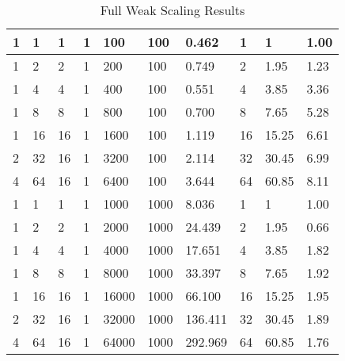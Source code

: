 \begin{appendices}
\begin{table}[H]
\begin{tabular}{|l|l|l|l|l|l|l|l|l|l|}
1 & 1 & 1 & 1 & 100 & 100 & 0.462 & 1 & 1 & 1.00 \\ \hline
1 & 2 & 2 & 1 & 200 & 100 & 0.749 & 2 & 1.95 & 1.23 \\ \hline
1 & 4 & 4 & 1 & 400 & 100 & 0.551 & 4 & 3.85 & 3.36 \\ \hline
1 & 8 & 8 & 1 & 800 & 100 & 0.700 & 8 & 7.65 & 5.28 \\ \hline
1 & 16 & 16 & 1 & 1600 & 100 & 1.119 & 16 & 15.25 & 6.61 \\ \hline
2 & 32 & 16 & 1 & 3200 & 100 & 2.114 & 32 & 30.45 & 6.99 \\ \hline
4 & 64 & 16 & 1 & 6400 & 100 & 3.644 & 64 & 60.85 & 8.11 \\ \hline
1 & 1 & 1 & 1 & 1000 & 1000 & 8.036 & 1 & 1 & 1.00 \\ \hline
1 & 2 & 2 & 1 & 2000 & 1000 & 24.439 & 2 & 1.95 & 0.66 \\ \hline
1 & 4 & 4 & 1 & 4000 & 1000 & 17.651 & 4 & 3.85 & 1.82 \\ \hline
1 & 8 & 8 & 1 & 8000 & 1000 & 33.397 & 8 & 7.65 & 1.92 \\ \hline
1 & 16 & 16 & 1 & 16000 & 1000 & 66.100 & 16 & 15.25 & 1.95 \\ \hline
2 & 32 & 16 & 1 & 32000 & 1000 & 136.411 & 32 & 30.45 & 1.89 \\ \hline
4 & 64 & 16 & 1 & 64000 & 1000 & 292.969 & 64 & 60.85 & 1.76 \\ \hline
\end{tabular}
\caption{Full Weak Scaling Results}
\label{tab:weak-results}
\end{table}

\end{appendices}